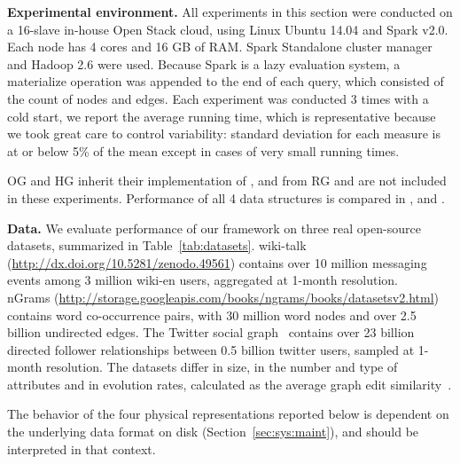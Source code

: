 {\bf Experimental environment.} All experiments in this section were
conducted on a 16-slave in-house Open Stack cloud, using Linux Ubuntu
14.04 and Spark v2.0.  Each node has 4 cores and 16 GB of RAM.  Spark
Standalone cluster manager and Hadoop 2.6 were used.
%
Because Spark is a lazy evaluation system, a materialize operation was
appended to the end of each query, which consisted of the count of
nodes and edges.  Each experiment was conducted 3 times with a cold
start, we report the average running time, which is representative
because we took great care to control variability: standard deviation
for each measure is at or below 5\% of the mean except in cases of
very small running times.

OG and HG inherit their implementation of , 
and  from RG and are not included in these
experiments.  Performance of all 4 data structures is compared in
,  and .

{\bf Data.}  We evaluate performance of our framework on three real
open-source datasets, summarized in Table~\ref{tab:datasets}.
wiki-talk (\url{http://dx.doi.org/10.5281/zenodo.49561}) contains over
10 million messaging events among 3 million wiki-en users, aggregated at 1-month resolution.\\nGrams
(\url{http://storage.googleapis.com/books/ngrams/books/datasetsv2.html})
contains word co-occurrence pairs, with
30 million word nodes and over 2.5 billion undirected edges.  The
Twitter social graph~\cite{Gabielkov:2014:SSN:2591971.2591985}
contains over 23 billion directed follower relationships between 0.5
billion twitter users, sampled at 1-month
resolution. The datasets differ in size, in the number
and type of attributes and in evolution rates, calculated as the
average graph edit similarity~\cite{Ren2011}. 

The behavior of the four physical representations reported below is
dependent on the underlying data format on disk
(Section~\ref{sec:sys:maint}), and should be interpreted in that
context.

